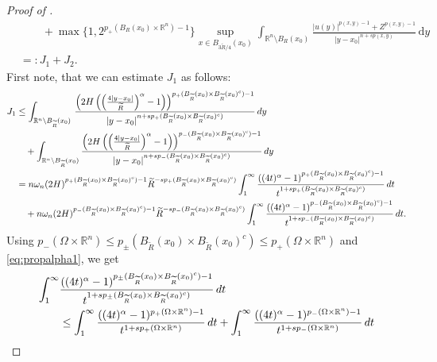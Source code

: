 \documentclass[10pt,a4paper]{amsart}
\newcommand{\R}{\mathbb{R}}
\renewcommand{\d}{\textnormal{d}}
\begin{document}
\begin{proof} [Proof of ]
\begin{align*}
&\qquad +\max\{1,2^{p_+(B_R(x_0)\times\R^n)-1}\}\sup_{x \in B_{3\widetilde{R}/4}(x_0)} \int_{\mathbb{R}^n \setminus B_{R}(x_0)} \frac{|u(y)|^{p(x,y)-1}+Z^{p(x,y)-1}}{|y-x_0|^{n+sp(x,y)}} \,\mathrm{d}y\\
&  =:J_1+J_2.
\end{align*}
First note, that we can estimate $J_1$ as follows:
\begin{align*}
J_1&\leq \int_{\mathbb{R}^n \setminus B_{\widetilde{R}}(x_0)} \,\frac{\left(2H\left(\left( \frac{4|y-x_0|}{\widetilde{R}} \right)^{\alpha}-1\right)\right)^{p_+(B_{\widetilde{R}}(x_0) \times B_{\widetilde{R}}(x_0)^c)-1}}{|y-x_0|^{n+sp_+(B_{\widetilde{R}}(x_0) \times B_{\widetilde{R}}(x_0)^c)}} \, \d y\\
&\quad + \int_{\mathbb{R}^n \setminus B_{\widetilde{R}}(x_0)} \frac{\left(2H\left(\left( \frac{4|y-x_0|}{\widetilde{R}} \right)^{\alpha}-1\right)\right)^{p_-(B_{\widetilde{R}}(x_0) \times B_{\widetilde{R}}(x_0)^c)-1}}{|y-x_0|^{n+sp_-(B_{\widetilde{R}}(x_0) \times B_{\widetilde{R}}(x_0)^c)}}\, \d y\\
& = n\omega_n (2H)^{p_+(B_{\widetilde{R}}(x_0) \times B_{\widetilde{R}}(x_0)^c)-1} \widetilde{R}^{-sp_+(B_{\widetilde{R}}(x_0) \times B_{\widetilde{R}}(x_0)^c)}\int^{\infty}_1 \frac{((4t)^{\alpha} - 1)^{p_{+}(B_{\widetilde{R}}(x_0)\times B_{\widetilde{R}}(x_0)^c)-1}}{t^{1+sp_{+}(B_{\widetilde{R}}(x_0)\times B_{\widetilde{R}}(x_0)^c)}}\, \d t \\
& \quad + n\omega_n (2H)^{p_-(B_{\widetilde{R}}(x_0) \times B_{\widetilde{R}}(x_0)^c)-1} \widetilde{R}^{-sp_-(B_{\widetilde{R}}(x_0) \times B_{\widetilde{R}}(x_0)^c)}\int^{\infty}_1 \frac{((4t)^{\alpha} - 1)^{p_{-}(B_{\widetilde{R}}(x_0)\times B_{\widetilde{R}}(x_0)^c)-1}}{t^{1+sp_{-}(B_{\widetilde{R}}(x_0)\times B_{\widetilde{R}}(x_0)^c)}}\, \d t.
\end{align*}
Using $p_{-}(\Omega\times\R^n)\leq p_{\pm}(B_{\widetilde{R}}(x_0)\times B_{\widetilde{R}}(x_0)^c) \leq p_{+}(\Omega\times\R^n)$ and \eqref{eq:propalpha1}, we get 
\begin{align*}
\int^{\infty}_1& \frac{((4t)^{\alpha} - 1)^{p_{\pm}(B_{\widetilde{R}}(x_0)\times B_{\widetilde{R}}(x_0)^c)-1}}{t^{1+sp_{\pm}(B_{\widetilde{R}}(x_0)\times B_{\widetilde{R}}(x_0)^c)}}\, \d t \\
&\leq \int^{\infty}_1 \frac{((4t)^{\alpha} - 1)^{p_{+}(\Omega\times \R^n)-1}}{t^{1+sp_{+}(\Omega\times \R^n)}}\, \d t
+ \int^{\infty}_1 \frac{((4t)^{\alpha} - 1)^{p_{-}(\Omega\times \R^n)-1}}{t^{1+sp_{-}(\Omega\times \R^n)}}\, \d t \\

\end{align*}
\end{proof}
\end{document}
